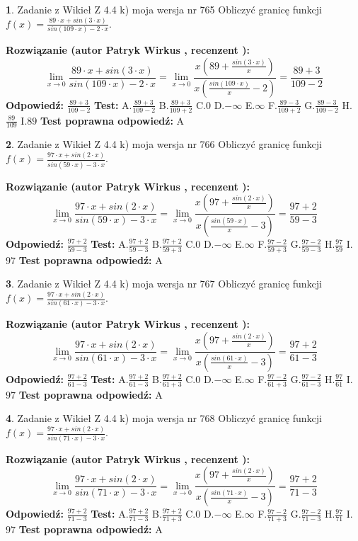 \documentclass[12pt, a4paper]{article}
\theoremstyle{definition} %
\newtheorem{zad}{}
\newcommand{\zadStart}[1]{\begin{zad}#1\newline}
\newcommand{\zadStop}{\end{zad}}
\newcommand{\rozwStart}[2]{\noindent \textbf{Rozwiązanie (autor #1 , recenzent #2): }\newline}
\newcommand{\rozwStop}{\newline}
\newcommand{\odpStart}{\noindent \textbf{Odpowiedź:}\newline}
\newcommand{\odpStop}{\newline}
\newcommand{\testStart}{\noindent \textbf{Test:}\newline}
\newcommand{\testStop}{\newline}
\newcommand{\kluczStart}{\noindent \textbf{Test poprawna odpowiedź:}\newline}
\newcommand{\kluczStop}{\newline}
\begin{document}
\zadStart{Zadanie z Wikieł Z 4.4 k) moja wersja nr 765}
Obliczyć granicę funkcji $f(x)=\frac{89\cdot x +sin(3\cdot x)}{sin(109\cdot x) -2\cdot x}$.
\zadStop
\rozwStart{Patryk Wirkus}{}
$$\lim\limits_{x\to 0}\frac{89\cdot x +sin(3\cdot x)}{sin(109\cdot x) -2\cdot x}
=\lim\limits_{x\to 0}\frac{x(89+\frac{sin(3\cdot x)}{x})}{x(\frac{sin(109\cdot x)}{x}-2)}
=\frac{89+3}{109-2}$$
\rozwStop
\odpStart
$\frac{89+3}{109-2}$
\odpStop
\testStart
A.$\frac{89+3}{109-2}$
B.$\frac{89+3}{109+2}$
C.$0$
D.$-\infty$
E.$\infty$
F.$\frac{89-3}{109+2}$
G.$\frac{89-3}{109-2}$
H.$\frac{89}{109}$
I.$89$
\testStop
\kluczStart
A
\kluczStop



\zadStart{Zadanie z Wikieł Z 4.4 k) moja wersja nr 766}
Obliczyć granicę funkcji $f(x)=\frac{97\cdot x +sin(2\cdot x)}{sin(59\cdot x) -3\cdot x}$.
\zadStop
\rozwStart{Patryk Wirkus}{}
$$\lim\limits_{x\to 0}\frac{97\cdot x +sin(2\cdot x)}{sin(59\cdot x) -3\cdot x}
=\lim\limits_{x\to 0}\frac{x(97+\frac{sin(2\cdot x)}{x})}{x(\frac{sin(59\cdot x)}{x}-3)}
=\frac{97+2}{59-3}$$
\rozwStop
\odpStart
$\frac{97+2}{59-3}$
\odpStop
\testStart
A.$\frac{97+2}{59-3}$
B.$\frac{97+2}{59+3}$
C.$0$
D.$-\infty$
E.$\infty$
F.$\frac{97-2}{59+3}$
G.$\frac{97-2}{59-3}$
H.$\frac{97}{59}$
I.$97$
\testStop
\kluczStart
A
\kluczStop



\zadStart{Zadanie z Wikieł Z 4.4 k) moja wersja nr 767}
Obliczyć granicę funkcji $f(x)=\frac{97\cdot x +sin(2\cdot x)}{sin(61\cdot x) -3\cdot x}$.
\zadStop
\rozwStart{Patryk Wirkus}{}
$$\lim\limits_{x\to 0}\frac{97\cdot x +sin(2\cdot x)}{sin(61\cdot x) -3\cdot x}
=\lim\limits_{x\to 0}\frac{x(97+\frac{sin(2\cdot x)}{x})}{x(\frac{sin(61\cdot x)}{x}-3)}
=\frac{97+2}{61-3}$$
\rozwStop
\odpStart
$\frac{97+2}{61-3}$
\odpStop
\testStart
A.$\frac{97+2}{61-3}$
B.$\frac{97+2}{61+3}$
C.$0$
D.$-\infty$
E.$\infty$
F.$\frac{97-2}{61+3}$
G.$\frac{97-2}{61-3}$
H.$\frac{97}{61}$
I.$97$
\testStop
\kluczStart
A
\kluczStop



\zadStart{Zadanie z Wikieł Z 4.4 k) moja wersja nr 768}
Obliczyć granicę funkcji $f(x)=\frac{97\cdot x +sin(2\cdot x)}{sin(71\cdot x) -3\cdot x}$.
\zadStop
\rozwStart{Patryk Wirkus}{}
$$\lim\limits_{x\to 0}\frac{97\cdot x +sin(2\cdot x)}{sin(71\cdot x) -3\cdot x}
=\lim\limits_{x\to 0}\frac{x(97+\frac{sin(2\cdot x)}{x})}{x(\frac{sin(71\cdot x)}{x}-3)}
=\frac{97+2}{71-3}$$
\rozwStop
\odpStart
$\frac{97+2}{71-3}$
\odpStop
\testStart
A.$\frac{97+2}{71-3}$
B.$\frac{97+2}{71+3}$
C.$0$
D.$-\infty$
E.$\infty$
F.$\frac{97-2}{71+3}$
G.$\frac{97-2}{71-3}$
H.$\frac{97}{71}$
I.$97$
\testStop
\kluczStart
A
\kluczStop
\end{document}
